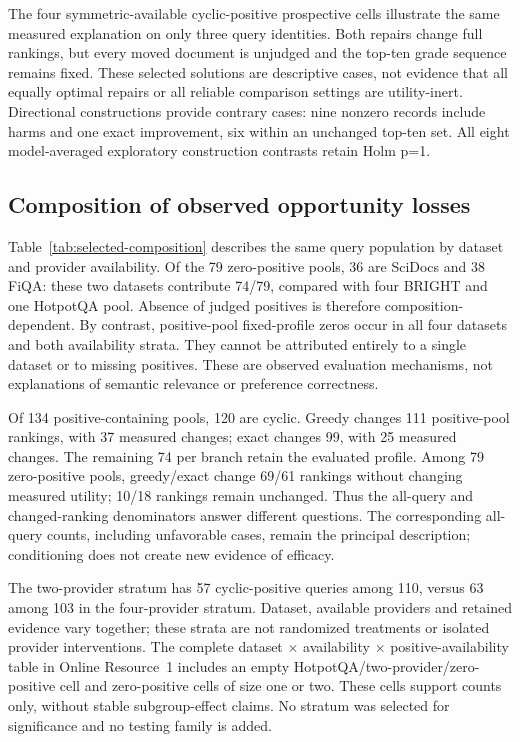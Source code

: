 \documentclass[pdflatex,iicol,sn-basic,Numbered]{sn-jnl}
\begin{document}
The four symmetric-available cyclic-positive prospective cells illustrate the same measured explanation on only three query identities. Both repairs change full rankings, but every moved document is unjudged and the top-ten grade sequence remains fixed. These selected solutions are descriptive cases, not evidence that all equally optimal repairs or all reliable comparison settings are utility-inert. Directional constructions provide contrary cases: nine nonzero records include harms and one exact improvement, six within an unchanged top-ten set. All eight model-averaged exploratory construction contrasts retain Holm p=1.


\subsection{Composition of observed opportunity losses}

Table~\ref{tab:selected-composition} describes the same query population by dataset and provider availability. Of the 79 zero-positive pools, 36 are SciDocs and 38 FiQA: these two datasets contribute 74/79, compared with four BRIGHT and one HotpotQA pool. Absence of judged positives is therefore composition-dependent. By contrast, positive-pool fixed-profile zeros occur in all four datasets and both availability strata. They cannot be attributed entirely to a single dataset or to missing positives. These are observed evaluation mechanisms, not explanations of semantic relevance or preference correctness.

Of 134 positive-containing pools, 120 are cyclic. Greedy changes 111 positive-pool rankings, with 37 measured changes; exact changes 99, with 25 measured changes. The remaining 74 per branch retain the evaluated profile. Among 79 zero-positive pools, greedy/exact change 69/61 rankings without changing measured utility; 10/18 rankings remain unchanged. Thus the all-query and changed-ranking denominators answer different questions. The corresponding all-query counts, including unfavorable cases, remain the principal description; conditioning does not create new evidence of efficacy.

The two-provider stratum has 57 cyclic-positive queries among 110, versus 63 among 103 in the four-provider stratum. Dataset, available providers and retained evidence vary together; these strata are not randomized treatments or isolated provider interventions. The complete dataset $\times$ availability $\times$ positive-availability table in Online Resource~1 includes an empty HotpotQA/two-provider/zero-positive cell and zero-positive cells of size one or two. These cells support counts only, without stable subgroup-effect claims. No stratum was selected for significance and no testing family is added.
\end{document}
